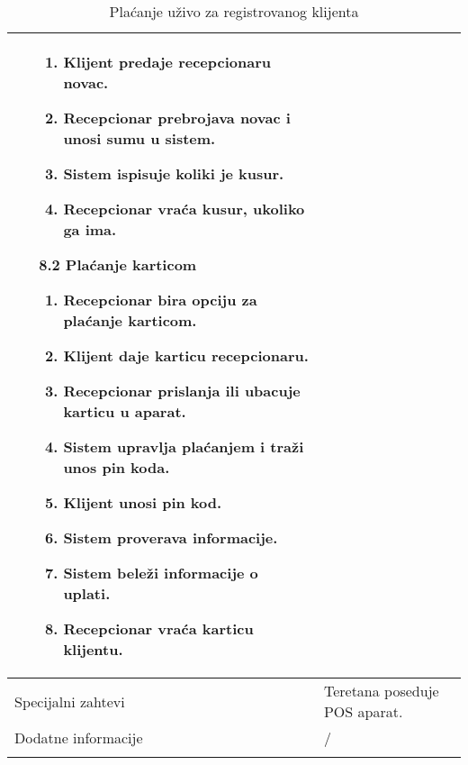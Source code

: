 \documentclass[../main.tex]{subfiles}
\begin{document}
\begin{longtable}{| p{} | p{} |}
\begin{itemize}
\begin{enumerate}
            \item Klijent predaje recepcionaru novac.
            \item Recepcionar prebrojava novac i unosi sumu u sistem.
            \item Sistem ispisuje koliki je kusur.
            \item Recepcionar vraća kusur, ukoliko ga ima.
        \end{enumerate} 
        \item[8.2] Plaćanje karticom \begin{enumerate}
            \item Recepcionar bira opciju za plaćanje karticom.
            \item Klijent daje karticu recepcionaru.
            \item Recepcionar prislanja ili ubacuje karticu u aparat.
            \item Sistem upravlja plaćanjem i traži unos pin koda.
            \item Klijent unosi pin kod.
            \item Sistem proverava informacije.
            \item Sistem beleži informacije o uplati.
            \item Recepcionar vraća karticu klijentu.	
        \end{enumerate}
    \end{itemize}\\
\hline
    Specijalni zahtevi & Teretana poseduje POS aparat.\\
\hline
    Dodatne informacije & /\\
\hline
\caption{Plaćanje uživo za registrovanog klijenta} %
\end{longtable}
\end{document}
